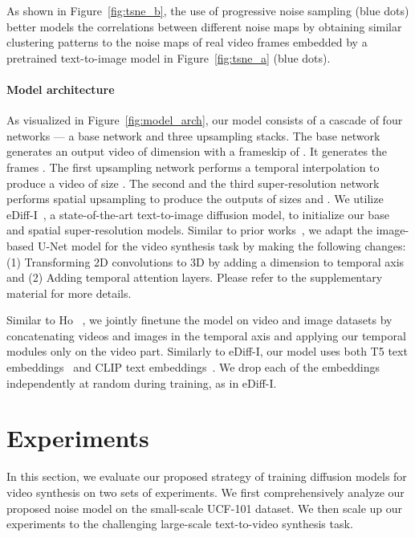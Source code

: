 \documentclass[10pt,twocolumn,letterpaper]{article}
\newcommand{\ediffi}{eDiff-I\xspace}
\begin{document}
As shown in Figure~\ref{fig:tsne_b}, the use of progressive noise sampling (blue dots) better models the correlations between different noise maps by obtaining similar clustering patterns to the noise maps of real video frames embedded by a pretrained text-to-image model in Figure~\ref{fig:tsne_a} (blue dots).



\paragraph{Model architecture}

As visualized in Figure~\ref{fig:model_arch}, our model consists of a cascade of four networks --- a base network and three upsampling stacks. The base network generates an output video of dimension  with a frameskip of . It generates the frames . The first upsampling network performs a temporal interpolation to produce a video of size . The second and the third super-resolution network performs spatial upsampling to produce the outputs of sizes  and . We utilize \ediffi~\cite{balaji2022ediffi}, a state-of-the-art text-to-image diffusion model, to initialize our base and spatial super-resolution models. Similar to prior works~\cite{ho2022video, singer2022make}, we adapt the image-based U-Net model for the video synthesis task by making the following changes: (1) Transforming 2D convolutions to 3D by adding a dimension  to temporal axis and (2) Adding temporal attention layers. Please refer to the supplementary material for more details. 

Similar to Ho \etal~\cite{ho2022video}, we jointly finetune the model on video and image datasets by concatenating videos and images in the temporal axis and applying our temporal modules only on the video part. Similarly to \ediffi, our model uses both T5 text embeddings~\cite{raffel2020exploring} and CLIP text embeddings~\cite{radford2021learning}. We drop each of the embeddings independently at random during training, as in \ediffi. 




 \section{Experiments}\label{sec:expr}

In this section, we evaluate our proposed strategy of training diffusion models for video synthesis on two sets of experiments. We first comprehensively analyze our proposed noise model on the small-scale UCF-101 dataset. We then scale up our experiments to the challenging large-scale text-to-video synthesis task.
\end{document}
